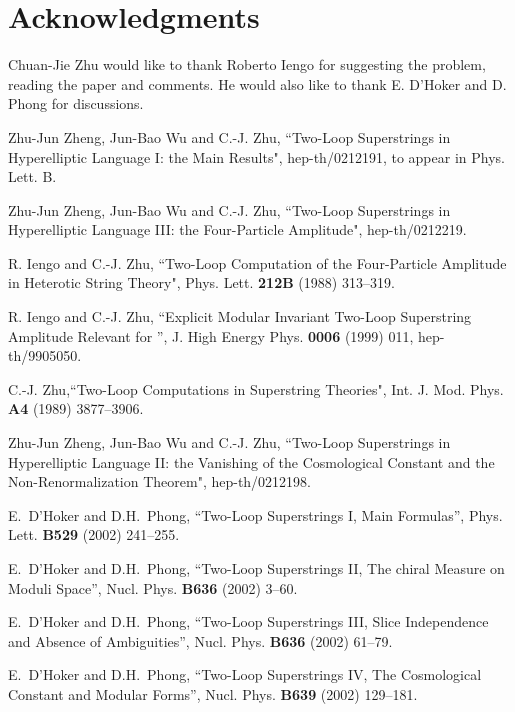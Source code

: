 \documentclass[a4paper,12pt]{article}
\begin{document}
\section*{Acknowledgments}

Chuan-Jie Zhu would like to thank Roberto Iengo for suggesting the
problem, reading the paper and comments. He would also like to
thank E. D'Hoker and D. Phong for discussions.

\begin{thebibliography}{[20]}

 Zhu-Jun Zheng, Jun-Bao Wu and  C.-J. Zhu,
``Two-Loop Superstrings in Hyperelliptic Language I: the Main
Results", hep-th/0212191, to appear in Phys. Lett. B.

 Zhu-Jun Zheng, Jun-Bao Wu and  C.-J. Zhu,
``Two-Loop Superstrings in Hyperelliptic Language III: the
Four-Particle Amplitude", hep-th/0212219.

 R. Iengo and C.-J. Zhu, ``Two-Loop Computation of
the Four-Particle Amplitude in Heterotic String Theory", Phys.
Lett. {\bf  212B} (1988) 313--319.

 R. Iengo and C.-J. Zhu, ``Explicit Modular
Invariant Two-Loop Superstring Amplitude Relevant for \coordHE{}'', J.
High Energy Phys. {\bf 0006} (1999) 011, hep-th/9905050.

 C.-J. Zhu,``Two-Loop Computations in
Superstring Theories", Int. J. Mod. Phys. {\bf A4} (1989)
3877--3906.

 Zhu-Jun Zheng, Jun-Bao Wu and  C.-J. Zhu,
``Two-Loop Superstrings in Hyperelliptic Language II: the
Vanishing of the Cosmological Constant and the Non-Renormalization
Theorem", hep-th/0212198.

 E.~D'Hoker and D.H.~Phong, ``Two-Loop
Superstrings I, Main Formulas'', Phys. Lett. {\bf B529} (2002)
241--255.

 E.~D'Hoker and D.H.~Phong, ``Two-Loop
Superstrings II, The chiral Measure on Moduli Space'', Nucl. Phys.
{\bf B636} (2002) 3--60.

 E.~D'Hoker and D.H.~Phong, ``Two-Loop
Superstrings III, Slice Independence and Absence of Ambiguities'',
Nucl. Phys. {\bf B636} (2002) 61--79.

 E.~D'Hoker and D.H.~Phong, ``Two-Loop
Superstrings IV, The Cosmological Constant and Modular Forms'',
Nucl. Phys. {\bf B639} (2002) 129--181.


\end{thebibliography}
\end{document}

